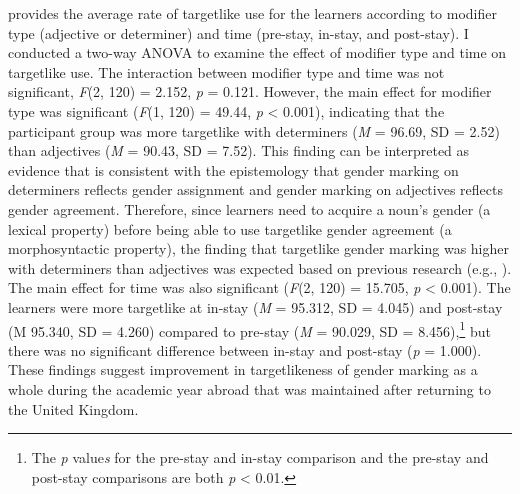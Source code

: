 \documentclass[output=paper,colorlinks,citecolor=brown,modfonts,nonflat]{../langscibook}
\begin{document}
 provides the average rate of targetlike use for the learners according to modifier type (adjective or determiner) and time (pre-stay, in-stay, and post-stay). I conducted a two-way ANOVA to examine the effect of modifier type and time on targetlike use. The interaction between modifier type and time was not significant, \textit{F}(2, 120) = 2.152, \textit{p} = 0.121. However, the main effect for modifier type was significant (\textit{F}(1, 120) = 49.44, \textit{p} < 0.001), indicating that the participant group was more targetlike with determiners (\textit{M} = 96.69, SD = 2.52) than adjectives (\textit{M} = 90.43, SD = 7.52).  This finding can be interpreted as evidence that is consistent with the epistemology that gender marking on determiners reflects gender assignment and gender marking on adjectives reflects gender agreement. Therefore, since learners need to acquire a noun’s gender (a lexical property) before being able to use targetlike gender agreement (a morphosyntactic property), the finding that targetlike gender marking was higher with determiners than adjectives was expected based on previous research (e.g., \citealt{Alarcón2010}). The main effect for time was also significant (\textit{F}(2, 120) = 15.705, \textit{p} < 0.001). The learners were more targetlike at in-stay (\textit{M} = 95.312, SD = 4.045) and post-stay (M 95.340, SD = 4.260) compared to pre-stay (\textit{M} = 90.029, SD = 8.456),\footnote{The \textit{p} value\textit{s} for the pre-stay and in-stay comparison and the pre-stay and post-stay comparisons are both \textit{p} < 0.01.} but there was no significant difference between in-stay and post-stay (\textit{p} = 1.000). These findings suggest improvement in targetlikeness of gender marking as a whole during the academic year abroad that was maintained after returning to the United Kingdom.


\begin{table}
\caption{Rates of targetlike use (in percentages)\label{tab:gudmestad:2}}
\end{table}
\end{document}
